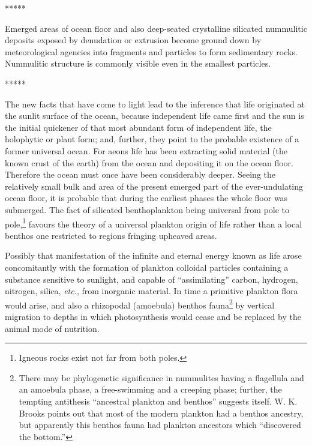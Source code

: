 \documentclass[a4paper, 12pt, oneside]{article}
\begin{document}
\centerline{*\hspace{15mm}*\hspace{15mm}*\hspace{15mm}*\hspace{15mm}*}
\bigskip

Emerged areas of ocean floor and also deep-seated crystalline silicated nummulitic deposits exposed by denudation or extrusion become ground down by meteorological agencies into fragments and particles to form sedimentary rocks. Nummulitic structure is commonly visible even in the smallest particles.

\centerline{*\hspace{15mm}*\hspace{15mm}*\hspace{15mm}*\hspace{15mm}*}
\bigskip

The new facts that have come to light lead to the inference that life originated at the sunlit surface of the ocean, because independent life came first and the sun is the initial quickener of that most abundant form of independent life, the holophytic or plant form; and, further, they point to the probable existence of a former universal ocean. For aeons life has been extracting solid material (the known crust of the earth) from the ocean and depositing it on the ocean floor. Therefore the ocean must once have been considerably deeper. Seeing the relatively small bulk and area of the present emerged part of the ever-undulating ocean floor, it is probable that during the earliest phases the whole floor was submerged. The fact of silicated benthoplankton being universal from pole to pole,\footnote{Igneous rocks exist not far from both poles.} favours the theory of a universal plankton origin of life rather than a local benthos one restricted to regions fringing upheaved areas.

Possibly that manifestation of the infinite and eternal energy known as life arose concomitantly with the formation of plankton colloidal particles containing a substance sensitive to sunlight, and capable of ``assimilating'' carbon, hydrogen, nitrogen, silica, \emph{etc.}, from inorganic material. In time a primitive plankton flora would arise, and also a rhizopodal (amoebula) benthos fauna\footnote{There may be phylogenetic significance in nummulites having a flagellula and an amoebula phase, a free-swimming and a creeping phase; further, the tempting antithesis ``ancestral plankton and benthos'' suggests itself. W. K. Brooks points out that most of the modern plankton had a benthos ancestry, but apparently this benthos fauna had plankton ancestors which ``discovered the bottom.''} by vertical migration to depths in which photosynthesis would cease and be replaced by the animal mode of nutrition.
\end{document}
